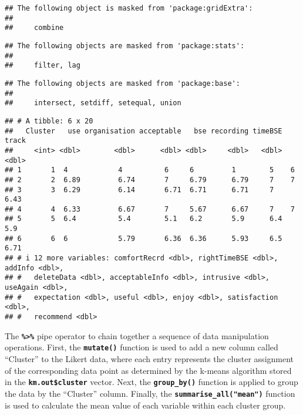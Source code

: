 \documentclass[
]{article}
\newenvironment{Shaded}{\begin{snugshade}}{\end{snugshade}}
\newcommand{\AttributeTok}[1]{\textcolor[rgb]{0.13,0.29,0.53}{#1}}
\newcommand{\FunctionTok}[1]{\textcolor[rgb]{0.13,0.29,0.53}{\textbf{#1}}}
\newcommand{\NormalTok}[1]{#1}
\newcommand{\SpecialCharTok}[1]{\textcolor[rgb]{0.81,0.36,0.00}{\textbf{#1}}}
\newcommand{\StringTok}[1]{\textcolor[rgb]{0.31,0.60,0.02}{#1}}
\begin{document}
\begin{verbatim}
## The following object is masked from 'package:gridExtra':
## 
##     combine
\end{verbatim}

\begin{verbatim}
## The following objects are masked from 'package:stats':
## 
##     filter, lag
\end{verbatim}

\begin{verbatim}
## The following objects are masked from 'package:base':
## 
##     intersect, setdiff, setequal, union
\end{verbatim}

\begin{Shaded}
\end{Shaded}

\begin{verbatim}
## # A tibble: 6 x 20
##   Cluster   use organisation acceptable   bse recording timeBSE track
##     <int> <dbl>        <dbl>      <dbl> <dbl>     <dbl>   <dbl> <dbl>
## 1       1  4            4          6     6         1        5    6   
## 2       2  6.89         6.74       7     6.79      6.79     7    7   
## 3       3  6.29         6.14       6.71  6.71      6.71     7    6.43
## 4       4  6.33         6.67       7     5.67      6.67     7    7   
## 5       5  6.4          5.4        5.1   6.2       5.9      6.4  5.9 
## 6       6  6            5.79       6.36  6.36      5.93     6.5  6.71
## # i 12 more variables: comfortRecrd <dbl>, rightTimeBSE <dbl>, addInfo <dbl>,
## #   deleteData <dbl>, acceptableInfo <dbl>, intrusive <dbl>, useAgain <dbl>,
## #   expectation <dbl>, useful <dbl>, enjoy <dbl>, satisfaction <dbl>,
## #   recommend <dbl>
\end{verbatim}

The \textbf{\texttt{\%\textgreater{}\%}} pipe operator to chain together
a sequence of data manipulation operations. First, the
\textbf{\texttt{mutate()}} function is used to add a new column called
``Cluster'' to the Likert data, where each entry represents the cluster
assignment of the corresponding data point as determined by the k-means
algorithm stored in the \textbf{\texttt{km.out\$cluster}} vector. Next,
the \textbf{\texttt{group\_by()}} function is applied to group the data
by the ``Cluster'' column. Finally, the
\textbf{\texttt{summarise\_all("mean")}} function is used to calculate
the mean value of each variable within each cluster group.
\end{document}

